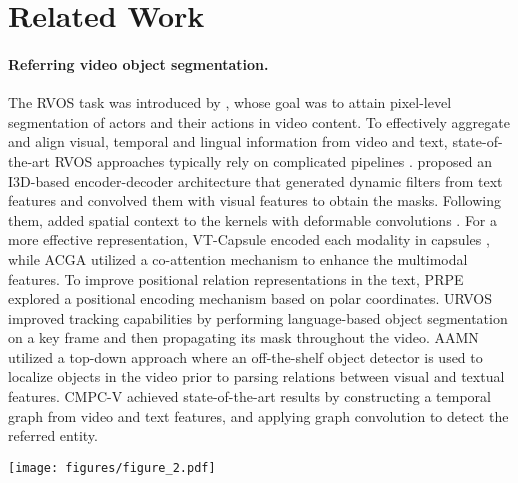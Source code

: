 \documentclass[10pt,twocolumn,letterpaper]{article}
\renewcommand{\cite}[1]{\citep{#1}}
\newcommand{\methodname}{MTTR}
\begin{document}
 \section{Related Work}
\label{sec:related}
\paragraph{Referring video object segmentation.}
The RVOS task was introduced by \citet{gavrilyuk2018a2d}, whose goal was to attain pixel-level segmentation of actors and their actions in video content. 
To effectively aggregate and align visual, temporal and lingual information from video and text, state-of-the-art RVOS approaches typically rely on complicated pipelines  \cite{wang2019acga,wang2020cmd,ning2020polar,McIntosh_2020_CVPR,liu2021cmpc}. \citet{gavrilyuk2018a2d} proposed an I3D-based \cite{carreira2017i3d} encoder-decoder architecture that generated dynamic filters from text features and convolved them with visual features to obtain the masks. Following them, \citet{wang2020cmd} added spatial context to the kernels with deformable convolutions \cite{Dai_2017_ICCV}. For a more effective representation, VT-Capsule \cite{McIntosh_2020_CVPR} encoded each modality in capsules \cite{capsule_networks_nips_2017}, while ACGA \cite{wang2019acga} utilized a co-attention mechanism to enhance the multimodal features.
To improve positional relation representations in the text, PRPE \cite{ning2020polar} explored a positional encoding mechanism based on polar coordinates. URVOS \cite{seo2020urvos} improved tracking capabilities by performing language-based object segmentation on a key frame and then propagating its mask throughout the video. AAMN \cite{yang2020aamn} utilized a top-down approach where an off-the-shelf object detector is used to localize objects in the video prior to parsing relations between visual and textual features.  CMPC-V \cite{liu2021cmpc} achieved state-of-the-art results by constructing a temporal graph from video and text features, and applying graph convolution \cite{graph_conf_ICLR_2017} to detect the referred entity.




\begin{figure*}
\centering
\texttt{[image: figures/figure\_2.pdf]}
 \caption{A detailed overview of \methodname{}. First, the input text and video frames are passed through feature encoders and then concatenated into multimodal sequences (one per frame). A multimodal Transformer then encodes the feature relations and decodes instance-level features into a set of prediction sequences. Next, corresponding mask and reference prediction sequences are generated. Finally, the predicted sequences are matched with the ground truth sequences for supervision (in training) or used to generate the final prediction (during inference).}
\label{fig:approach}
\vspace{-0.5cm}
\end{figure*}
\end{document}
